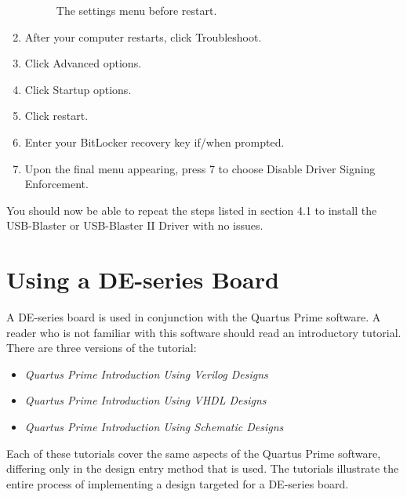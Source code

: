 \documentclass[11pt, twoside, pdftex]{article}
\newcommand{\commonPath}{../../Common}
\begin{document}
\begin{enumerate}
\begin{figure}[H]
\begin{center}
		\caption{The settings menu before restart.}
		\label{fig:15}
	\end{center}
\end{figure}
  \item After your computer restarts, click Troubleshoot.
  \item Click Advanced options.
  \item Click Startup options.
  \item Click restart.
  \item Enter your BitLocker recovery key if/when prompted.
  \item Upon the final menu appearing, press 7 to choose Disable Driver Signing Enforcement.
\end{enumerate}

You should now be able to repeat the steps listed in section 4.1 to install the USB-Blaster or USB-Blaster II Driver with no issues.

\section{Using a DE-series Board}

A DE-series board is used in conjunction with the Quartus Prime software.
A reader who is not familiar with this software should read an introductory
tutorial. There are three versions of the tutorial:
\begin{itemize}
	\item {\it Quartus Prime Introduction Using Verilog Designs}
	\item {\it Quartus Prime Introduction Using VHDL Designs}
	\item {\it Quartus Prime Introduction Using Schematic Designs}
\end{itemize}

\noindent
Each of these tutorials cover the same aspects of the Quartus Prime software,  
differing only in the design entry method that is used.
The tutorials illustrate the entire process of implementing a design targeted
for a DE-series board.


\end{document}
